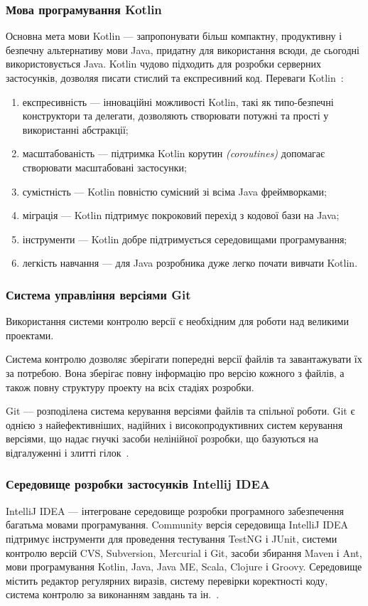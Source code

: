 \subsubsection{Мова програмування Kotlin}
Основна мета мови Kotlin --- запропонувати більш компактну, продуктивну і безпечну альтернативу мови Java, придатну для використання всюди, де сьогодні використовується Java.
Kotlin чудово підходить для розробки серверних застосунків, дозволяя писати стислий та експресивний код.
Переваги Kotlin~\cite{kotlin,Panchal2017}:  
\begin{enumerate}[label={\arabic*)}]
	\item експресивність --- інноваційні можливості Kotlin, такі як типо-безпечні конструктори та делегати, дозволяють створювати потужні та прості у використанні абстракції;
	\item масштабованість --- підтримка Kotlin корутин \textit{(coroutines)} допомагає створювати масштабовані застосунки;
	\item сумістність --- Kotlin повністю сумісний зі всіма Java фреймворками;
	\item міграція --- Kotlin підтримує покроковий перехід з кодової бази на Java;
	\item інструменти --- Kotlin добре підтримується середовищами програмування;
	\item легкість навчання --- для Java розробника дуже легко почати вивчати Kotlin.
\end{enumerate}

\subsubsection{Система управління версіями Git}
Використання системи контролю версії є необхідним для роботи над великими проектами.

Система контролю дозволяє зберігати попередні версії файлів та завантажувати їх за потребою. 
Вона зберігає повну інформацію про версію кожного з файлів, а також повну структуру проекту на всіх стадіях розробки.

Git --- розподілена система керування версіями файлів та спільної роботи. Git є однією з найефективніших, надійних і високопродуктивних систем керування версіями, що надає гнучкі засоби нелінійної розробки, що базуються на відгалуженні і злитті гілок~\cite{Chacon2009}.

\subsubsection{Середовище розробки застосунків Intellij IDEA}
IntelliJ IDEA --- інтегроване середовище розробки програмного забезпечення багатьма мовами програмування. 
Community версія середовища IntelliJ IDEA підтримує інструменти для проведення тестування TestNG і JUnit, системи контролю версій CVS, Subversion, Mercurial і Git, засоби збирання Maven і Ant, мови програмування Kotlin, Java, Java ME, Scala, Clojure і Groovy. 
Середовище містить редактор регулярних виразів, систему перевірки коректності коду, система контролю за виконанням завдань та ін.~\cite{Kalinichenko2013}.

